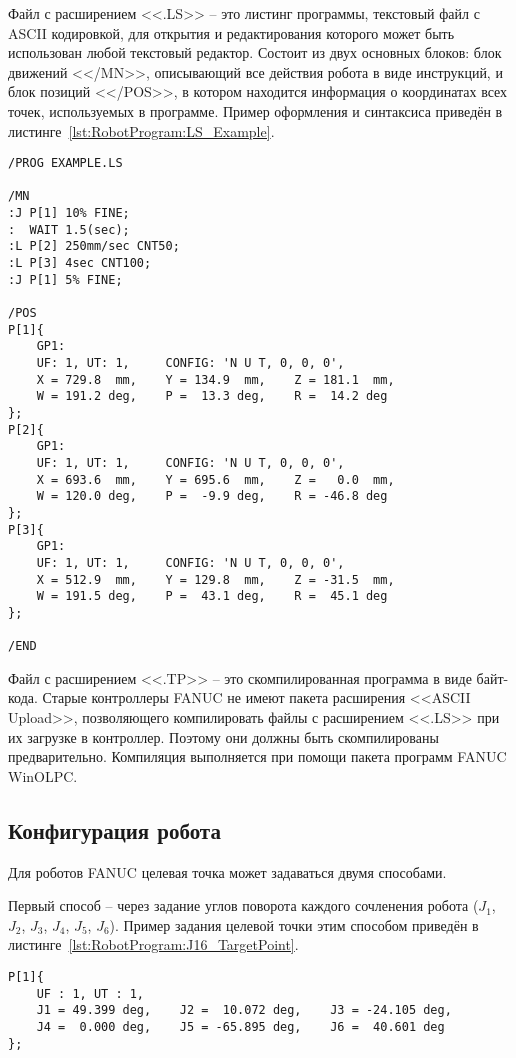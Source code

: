 Файл с расширением <<.LS>> -- это листинг программы, текстовый файл с ASCII кодировкой, для открытия и редактирования которого может быть использован любой текстовый редактор.
Состоит из двух основных блоков: блок движений <</MN>>, описывающий все действия робота в виде инструкций, и блок позиций <</POS>>, в котором находится информация о координатах всех точек, используемых в программе.
Пример оформления и синтаксиса приведён в листинге~\ref{lst:RobotProgram:LS_Example}.

\begin{lstlisting}[caption={Пример оформления .LS файлов}, label={lst:RobotProgram:LS_Example}]
/PROG EXAMPLE.LS

/MN
:J P[1] 10% FINE;
:  WAIT 1.5(sec);
:L P[2] 250mm/sec CNT50;
:L P[3] 4sec CNT100;
:J P[1] 5% FINE;

/POS
P[1]{
    GP1:
    UF: 1, UT: 1,     CONFIG: 'N U T, 0, 0, 0',
    X = 729.8  mm,    Y = 134.9  mm,    Z = 181.1  mm,
    W = 191.2 deg,    P =  13.3 deg,    R =  14.2 deg
};
P[2]{
    GP1:
    UF: 1, UT: 1,     CONFIG: 'N U T, 0, 0, 0',
    X = 693.6  mm,    Y = 695.6  mm,    Z =   0.0  mm,
    W = 120.0 deg,    P =  -9.9 deg,    R = -46.8 deg
};
P[3]{
    GP1:
    UF: 1, UT: 1,     CONFIG: 'N U T, 0, 0, 0',
    X = 512.9  mm,    Y = 129.8  mm,    Z = -31.5  mm,
    W = 191.5 deg,    P =  43.1 deg,    R =  45.1 deg
};

/END
\end{lstlisting}

Файл с расширением <<.TP>> -- это скомпилированная программа в виде байт-кода.
Старые контроллеры FANUC не имеют пакета расширения <<ASCII Upload>>, позволяющего компилировать файлы с расширением <<.LS>> при их загрузке в контроллер.
Поэтому они должны быть скомпилированы предварительно.
Компиляция выполняется при помощи пакета программ FANUC WinOLPC.

\subsection{Конфигурация робота}
Для роботов FANUC целевая точка может задаваться двумя способами.

Первый способ -- через задание углов поворота каждого сочленения робота ($J_1$, $J_2$, $J_3$, $J_4$, $J_5$, $J_6$).
Пример задания целевой точки этим способом приведён в листинге~\ref{lst:RobotProgram:J16_TargetPoint}.

\begin{lstlisting}[caption={Задание целевой точки с помощью углов J1-J6}, label={lst:RobotProgram:J16_TargetPoint}]
P[1]{
    UF : 1, UT : 1,
    J1 = 49.399 deg,    J2 =  10.072 deg,    J3 = -24.105 deg,
    J4 =  0.000 deg,    J5 = -65.895 deg,    J6 =  40.601 deg
};
\end{lstlisting}

